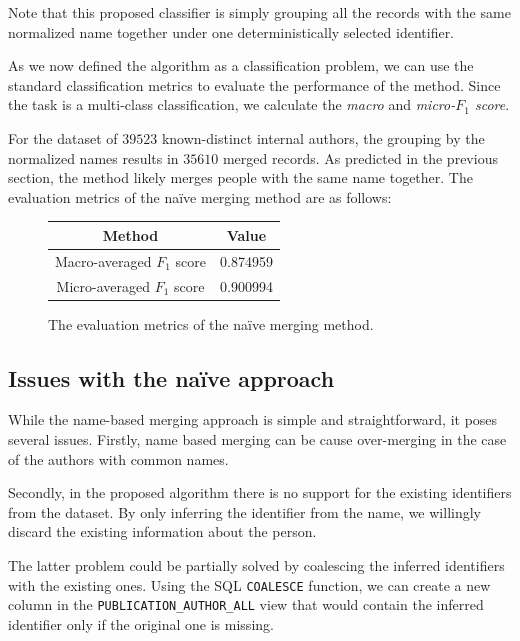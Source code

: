 Note that this proposed classifier is simply grouping all the records with the same normalized name together under one deterministically selected identifier.

As we now defined the algorithm as a classification problem, we can use the standard classification metrics to evaluate the performance of the method.
Since the task is a multi-class classification, we calculate the \textit{macro} and \textit{micro-$F_1$ score}.

For the dataset of $39523$ known-distinct internal authors, the grouping by the normalized names results in $35610$ merged records.
As predicted in the previous section, the method likely merges people with the same name together.
The evaluation metrics of the naïve merging method are as follows:

\begin{figure}[!ht]
    \captionsetup{width=.9\linewidth}
    \centering
    \begin{tabular}{|c|c|}
    \hline
        \textbf{Method} & \textbf{Value} \\ \hline
        Macro-averaged $F_1$ score & 0.874959 \\ \hline
        Micro-averaged $F_1$ score & 0.900994 \\ \hline
    \end{tabular}
    \caption{The evaluation metrics of the naïve merging method\protect\footnotemark.}
\end{figure}


\subsection{Issues with the naïve approach}

While the name-based merging approach is simple and straightforward, it poses several issues.
Firstly, name based merging can be cause over-merging in the case of the authors with common names.

Secondly, in the proposed algorithm there is no support for the existing identifiers from the dataset.
By only inferring the identifier from the name, we willingly discard the existing information about the person.

The latter problem could be partially solved by coalescing the inferred identifiers with the existing ones.
Using the SQL \texttt{COALESCE} function, we can create a new column in the \texttt{PUBLICATION\_AUTHOR\_ALL} view that would contain the inferred identifier only if the original one is missing.

